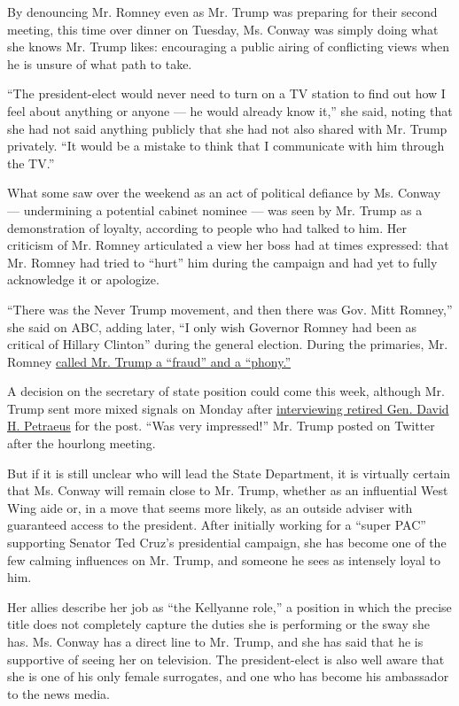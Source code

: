 By denouncing Mr. Romney even as Mr. Trump was preparing for their
second meeting, this time over dinner on Tuesday, Ms. Conway was simply
doing what she knows Mr. Trump likes: encouraging a public airing of
conflicting views when he is unsure of what path to take.

``The president-elect would never need to turn on a TV station to find
out how I feel about anything or anyone --- he would already know it,''
she said, noting that she had not said anything publicly that she had
not also shared with Mr. Trump privately. ``It would be a mistake to
think that I communicate with him through the TV.''

What some saw over the weekend as an act of political defiance by Ms.
Conway --- undermining a potential cabinet nominee --- was seen by Mr.
Trump as a demonstration of loyalty, according to people who had talked
to him. Her criticism of Mr. Romney articulated a view her boss had at
times expressed: that Mr. Romney had tried to ``hurt'' him during the
campaign and had yet to fully acknowledge it or apologize.

``There was the Never Trump movement, and then there was Gov. Mitt
Romney,'' she said on ABC, adding later, ``I only wish Governor Romney
had been as critical of Hillary Clinton'' during the general election.
During the primaries, Mr. Romney
\href{http://www.nytimes3xbfgragh.onion/2016/03/04/us/politics/mitt-romney-speech.html}{called
Mr. Trump a ``fraud'' and a ``phony.''}

A decision on the secretary of state position could come this week,
although Mr. Trump sent more mixed signals on Monday after
\href{http://www.nytimes3xbfgragh.onion/2016/11/28/us/politics/donald-trump-transition-david-petraeus.html}{interviewing
retired Gen. David H. Petraeus} for the post. ``Was very impressed!''
Mr. Trump posted on Twitter after the hourlong meeting.

But if it is still unclear who will lead the State Department, it is
virtually certain that Ms. Conway will remain close to Mr. Trump,
whether as an influential West Wing aide or, in a move that seems more
likely, as an outside adviser with guaranteed access to the president.
After initially working for a ``super PAC'' supporting Senator Ted
Cruz's presidential campaign, she has become one of the few calming
influences on Mr. Trump, and someone he sees as intensely loyal to him.

Her allies describe her job as ``the Kellyanne role,'' a position in
which the precise title does not completely capture the duties she is
performing or the sway she has. Ms. Conway has a direct line to Mr.
Trump, and she has said that he is supportive of seeing her on
television. The president-elect is also well aware that she is one of
his only female surrogates, and one who has become his ambassador to the
news media.


